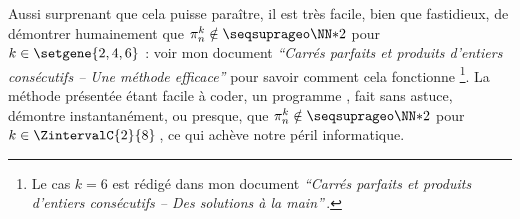 \leavevmode
\smallskip

Aussi surprenant que cela puisse paraître, il est très facile, bien que fastidieux, de démontrer humainement que $\consprod \notin \NNssquare$ pour $k \in \setgene{2, 4, 6}$ :
voir mon document \emph{\enquote{Carrés parfaits et produits d’entiers consécutifs – Une méthode efficace}} pour savoir comment cela fonctionne
\footnote{
	Le cas $k = 6$ est rédigé dans mon document \emph{\enquote{Carrés parfaits et produits d’entiers consécutifs – Des solutions à la main}}\,.
}.
La méthode présentée étant facile à coder, un programme \python, fait sans astuce, démontre instantanément, ou presque, que $\consprod \notin \NNssquare$ pour $k \in \ZintervalC{2}{8}$\,, ce qui achève notre péril informatique.